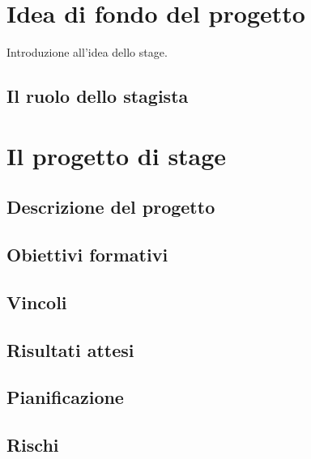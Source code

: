 \section{Idea di fondo del progetto}

Introduzione all'idea dello stage.
\subsection{Il ruolo dello stagista}
\section{Il progetto di stage}
\subsection{Descrizione del progetto}
\subsection{Obiettivi formativi}
\subsection{Vincoli}
\subsection{Risultati attesi}
\subsection{Pianificazione}
\subsection{Rischi}

